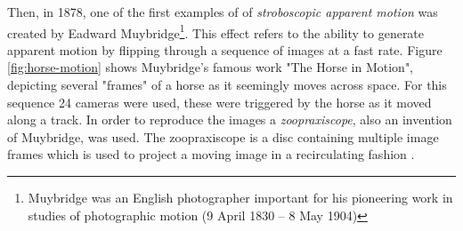 
Then, in 1878, one of the first examples of of \textit{stroboscopic apparent motion} was created by Eadward Muybridge\footnote{Muybridge was an English photographer important for his pioneering work in studies of photographic motion (9 April 1830 – 8 May 1904)}. This effect refers to the ability to generate apparent motion by flipping through a sequence of images at a fast rate. Figure \ref{fig:horse-motion} shows Muybridge's famous work "The Horse in Motion", depicting several "frames" of a horse as it seemingly moves across space. For this sequence 24 cameras were used, these were triggered by the horse as it moved along a track. In order to reproduce the images a \textit{zoopraxiscope}, also an invention of Muybridge, was used. The zoopraxiscope is a disc containing multiple image frames which is used to project a moving image in a recirculating fashion \cite{lavalle2016virtual}.

